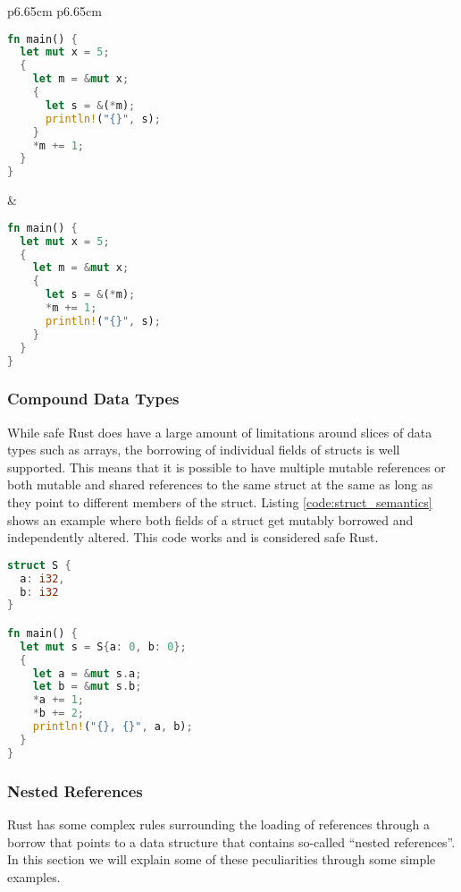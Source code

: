 \noindent
\begin{tabular}{p{6.65cm} p{6.65cm}}
    \begin{lstlisting}[language=Rust,frame=single,caption=Reborrow Example,label=code:reborrow_semantics]
fn main() {
  let mut x = 5;
  {
    let m = &mut x;
    {
      let s = &(*m);
      println!("{}", s);
    }
    *m += 1;
  }
}
    \end{lstlisting}

    &

    \begin{lstlisting}[language=Rust,frame=single,caption=Wrong Example,label=code:reborrow_semantics_wrong]
fn main() {
  let mut x = 5;
  {
    let m = &mut x;
    {
      let s = &(*m);
      *m += 1;
      println!("{}", s);
    }
  }
}
    \end{lstlisting}
\end{tabular}

\subsubsection{Compound Data Types}
While safe Rust does have a large amount of limitations around slices of data types such as arrays, the borrowing of individual fields of structs is well supported.
This means that it is possible to have multiple mutable references or both mutable and shared references to the same struct at the same as long as they point to different members of the struct.
Listing \ref{code:struct_semantics} shows an example where both fields of a struct get mutably borrowed and independently altered.
This code works and is considered safe Rust.

\begin{lstlisting}[language=Rust,frame=single,caption=Borrowing struct fields,label=code:struct_semantics]
struct S {
  a: i32,
  b: i32
}

fn main() {
  let mut s = S{a: 0, b: 0};
  {
    let a = &mut s.a;
    let b = &mut s.b;
    *a += 1;
    *b += 2;
    println!("{}, {}", a, b);
  }
}
\end{lstlisting}

\subsubsection{Nested References}
\label{sec:rust_nested}
Rust has some complex rules surrounding the loading of references through a borrow that points to a data structure that contains so-called ``nested references''.
In this section we will explain some of these peculiarities through some simple examples.

